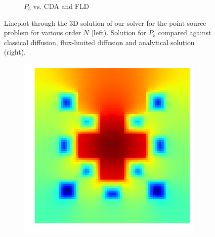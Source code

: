 \documentclass{egpubl}
\newcommand{\icaption}[1]{\caption{#1}}
\begin{document}
\begin{figure}[!t]
\begin{subfigure}{0.47\columnwidth}
\caption{$P_5$ vs. CDA and FLD}
\label{fig:pointsource_p5}
\end{subfigure}%
\icaption{Lineplot through the 3D solution of our solver for the point source problem for various order $N$ (left). Solution for $P_5$ compared against classical diffusion, flux-limited diffusion and analytical solution (right). \vspace{-0.14in}}
\label{fig:pointsource}
\end{figure}


\begin{figure}[h]
\centering
\begin{subfigure}{0.49\columnwidth}
\includegraphics[width=\columnwidth]{checkerboard2d_p1_neumann_staggered_starmap.png}
\end{subfigure}%
\hspace{0.01\columnwidth}
\begin{subfigure}{0.49\columnwidth}

\end{subfigure}
\end{figure}
\end{document}
